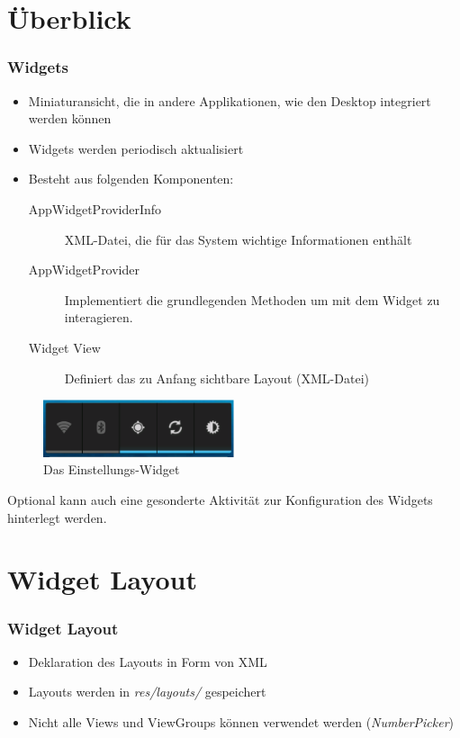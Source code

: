 \section{Überblick}
\begin{frame}[label=widgets]
   \frametitle{Widgets}
   \begin{itemize}
      \item Miniaturansicht, die in andere Applikationen, wie den Desktop integriert werden können
      \item Widgets werden periodisch aktualisiert
      \item Besteht aus folgenden Komponenten:
         \begin{description}
            \item[AppWidgetProviderInfo] XML-Datei, die für das System wichtige Informationen enthält
            \item[AppWidgetProvider] Implementiert die grundlegenden Methoden 
               um mit dem Widget zu interagieren.
            \item[Widget View] Definiert das zu Anfang sichtbare Layout (XML-Datei)
         \end{description}
   \end{itemize}

   \begin{figure}[h!]
      \centering
      \includegraphics[width=0.5\textwidth]{pictures/widget.eps}
      \caption{Das Einstellungs-Widget}
      \label{fig:widget}
   \end{figure}

   Optional kann auch eine gesonderte Aktivität zur Konfiguration des 
   Widgets hinterlegt werden.
\end{frame}

\section{Widget Layout}
\begin{frame}[label=widget_layout]
   \frametitle{Widget Layout}
   \begin{itemize}
      \item Deklaration des Layouts in Form von XML
      \item Layouts werden in \emph{res/layouts/} gespeichert
      \item Nicht alle Views und ViewGroups können verwendet werden (\emph{NumberPicker})
   \end{itemize}

   
\end{frame}

